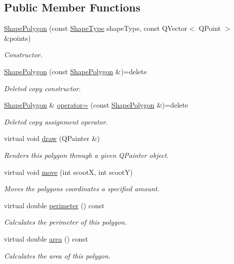 \subsection*{Public Member Functions}
\begin{DoxyCompactItemize}
\item 
\mbox{\hyperlink{class_shape_polygon_a885cea7a439a995f1ec5dc966abaa889}{Shape\+Polygon}} (const \mbox{\hyperlink{class_i_shape_a8f50993477b5ddb44c0547ef3d547cdc}{Shape\+Type}} shape\+Type, const Q\+Vector$<$ Q\+Point $>$ \&points)
\begin{DoxyCompactList}\small\item\em Constructor. \end{DoxyCompactList}\item 
\mbox{\hyperlink{class_shape_polygon_a51d433edd43f608acce1fae81e5583d5}{Shape\+Polygon}} (const \mbox{\hyperlink{class_shape_polygon}{Shape\+Polygon}} \&)=delete
\begin{DoxyCompactList}\small\item\em Deleted copy constructor. \end{DoxyCompactList}\item 
\mbox{\hyperlink{class_shape_polygon}{Shape\+Polygon}} \& \mbox{\hyperlink{class_shape_polygon_ae16e02c40d2c3e05aeba75613e38de12}{operator=}} (const \mbox{\hyperlink{class_shape_polygon}{Shape\+Polygon}} \&)=delete
\begin{DoxyCompactList}\small\item\em Deleted copy assignment operator. \end{DoxyCompactList}\item 
virtual void \mbox{\hyperlink{class_shape_polygon_a6f4ed4749a739aaf44b5680d75ae8538}{draw}} (Q\+Painter \&)
\begin{DoxyCompactList}\small\item\em Renders this polygon through a given Q\+Painter object. \end{DoxyCompactList}\item 
virtual void \mbox{\hyperlink{class_shape_polygon_a1f67f660d14090b21c00e2892f764451}{move}} (int scootX, int scootY)
\begin{DoxyCompactList}\small\item\em Moves the polygon\textquotesingle{}s coordinates a specified amount. \end{DoxyCompactList}\item 
virtual double \mbox{\hyperlink{class_shape_polygon_acb81cc3272ad00038abd6f1a7a155b2e}{perimeter}} () const
\begin{DoxyCompactList}\small\item\em Calculates the perimeter of this polygon. \end{DoxyCompactList}\item 
virtual double \mbox{\hyperlink{class_shape_polygon_a60c6cad5af503e0c405523a06e9471eb}{area}} () const
\begin{DoxyCompactList}\small\item\em Calculates the area of this polygon. \end{DoxyCompactList}\end{DoxyCompactItemize}
